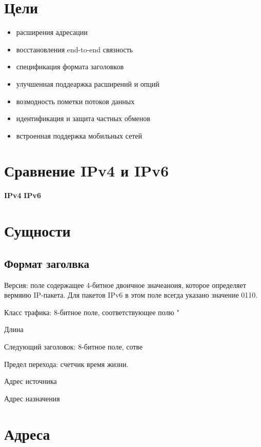 \documentclass[10pt,a4paper,oneside,titlepage]{report}
\theoremstyle{defenition}
\begin{document}
\section{Цели}

\begin{itemize}
	\item расширения адресации
	\item восстановления end-to-end связность
	\item спецификация формата заголовков
	\item улучшенная поддеаржка расширений и опций
	\item возмодность пометки потоков данных
	\item идентификация и защита частных обменов
	\item встроенная поддержка мобильных сетей
\end{itemize}

\section{Сравнение IPv4 и IPv6}

\begin{multicols}{2}
	{\bfseries IPv4}
	\columnbreak
	{\bfseries IPv6}
\end{multicols}

\section{Сущности}

\subsection{Формат заголвка}

Версия: поле содержащее 4-битное двоичное значеаноия, которое определяет вермяию IP-пакета. Для пакетов IPv6 в этом поле всегда указано значение 0110.

Класс трафика: 8-битное поле, соответствующее полю "

Длина

Следующий заголовок: 8-битное поле, сотве

Предел перехода: счетчик время жизни.

Адрес источника

Адрес назначения

\section{Адреса}
\end{document}
